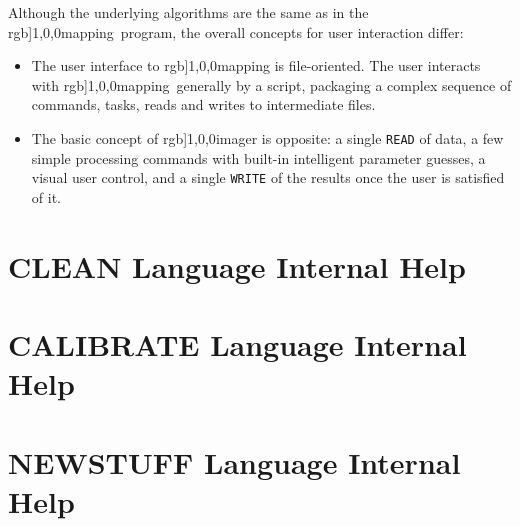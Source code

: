 \documentclass[11pt]{article}
\renewcommand{\mapping}{\mbox{{\color[rgb]{1,0,0}{\sc mapping}}}}
\renewcommand{\com}[1] {\mbox {{\color{magenta}\tt #1}}\index{#1}}
\newcommand{\imager} {\mbox{{\color[rgb]{1,0,0}{\sc imager}}}}
\newcommand{\imager} {\mbox{{{\sc imager}}}}
\renewcommand{\color}[1]{} %
\begin{document}
 Although the underlying algorithms are the same as in the
\mapping\ program, the overall concepts for user interaction differ:
\begin{itemize}
\item The user interface to \mapping{} is file-oriented. The user interacts
  with \mapping\ generally by a script, packaging a complex sequence of
  commands, tasks, reads and writes to intermediate files. 
\item
    The basic concept of \imager{} is opposite: a single \com{READ} of data, a
  few simple processing commands with built-in intelligent parameter
  guesses, a visual user control, and a single \com{WRITE} of the results
  once the user is satisfied of it.
\end{itemize}


\newpage


\newpage


\newpage


\newpage


\newpage


\newpage


%




\newpage
\section{CLEAN Language Internal Help} \label{CLEANH}


\newpage
\section{CALIBRATE Language Internal Help} \label{CLEANC}


\newpage
\section{NEWSTUFF Language Internal Help} \label{CLEANN}

\end{document}
